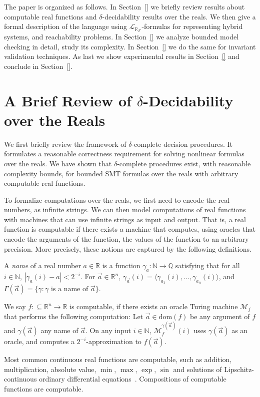 \documentclass[envcountsect]{llncs}
\newcommand{\dom}{\mathrm{dom}}
\newcommand{\lrf}{\mathcal{L}_{\mathbb{R}_{\mathcal{F}}}}
\begin{document}
The paper is organized as follows. In Section~\ref{} we briefly review results 
about computable real functions and $\delta$-decidability results over the
reals. We then give a formal description of the language using $\lrf$-formulas
for representing hybrid systems, and reachability problems. In Section~\ref{} we
analyze bounded model checking in detail, study its complexity. In
Section~\ref{} we do the same for invariant validation techniques. As last we
show experimental results in Section~\ref{} and conclude in Section~\ref{}.

\section{A Brief Review of $\delta$-Decidability over the Reals}\label{review}

We first briefly review the framework of $\delta$-complete decision procedures.
It formulates a reasonable correctness requirement for solving nonlinear
formulas over the reals. We have shown that $\delta$-complete procedures exist,
with reasonable complexity bounds, for bounded SMT formulas over the reals with
arbitrary computable real functions.

To formalize computations over the reals, we first need to encode the real
numbers, as infinite strings. We can then model
computations of real functions with machines that can use infinite strings as
input and output. That is, a real function is computable if there exists a
machine that computes, using oracles that encode the arguments of the function,
the values of the function to an arbitrary precision. More precisely, these
notions are captured by the following definitions.
\begin{definition}
A {\em name} of a real number $a\in \mathbb{R}$ is a function
$\mathcal{\gamma}_a: \mathbb{N}\rightarrow \mathbb{Q}$ satisfying that for all
$i\in \mathbb{N}$, $|\gamma_a(i) - a|<2^{-i}.$ For $\vec a\in \mathbb{R}^n$,
$\gamma_{\vec a}(i) = \langle \gamma_{a_1}(i), ..., \gamma_{a_n}(i)\rangle$, and
$\Gamma(\vec a) = \{\gamma: \gamma\mbox{ is a name of }\vec a\}$.
\end{definition}
\begin{definition} We say
$f:\subseteq\mathbb{R}^n\rightarrow \mathbb{R}$ is computable, if there exists
an oracle Turing machine $\mathcal{M}_f$ that performs the following
computation: Let $\vec a\in \dom(f)$ be any argument of $f$ and $\gamma(\vec a)$
any name of $\vec a$. On any input $i\in \mathbb{N}$,
$\mathcal{M}_f^{\gamma(\vec a)}(i)$ uses $\gamma(\vec a)$ as an oracle, and
computes a $2^{-i}$-approximation to $f(\vec a)$.
\end{definition}
Most common continuous real functions are computable, such as addition,
multiplication,  absolute value, $\min$, $\max$, $\exp$, $\sin$ and solutions of
Lipschitz-continuous ordinary differential equations~\cite{CAbook}. Compositions
of computable functions are computable.
\end{document}

